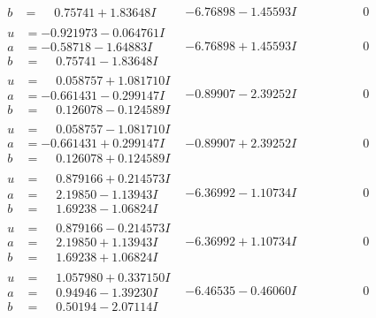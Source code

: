 \documentclass[1p]{elsarticle_modified}
\theoremstyle{definition}
\begin{document}
$$\begin{array}{c|c|c}
\begin{aligned}
b &= \phantom{-}0.75741 + 1.83648 I\end{aligned}
 & -6.76898 - 1.45593 I & \phantom{-0.000000 } 0 \\ \hline\begin{aligned}
u &= -0.921973 - 0.064761 I \\
a &= -0.58718 - 1.64883 I \\
b &= \phantom{-}0.75741 - 1.83648 I\end{aligned}
 & -6.76898 + 1.45593 I & \phantom{-0.000000 } 0 \\ \hline\begin{aligned}
u &= \phantom{-}0.058757 + 1.081710 I \\
a &= -0.661431 - 0.299147 I \\
b &= \phantom{-}0.126078 - 0.124589 I\end{aligned}
 & -0.89907 - 2.39252 I & \phantom{-0.000000 } 0 \\ \hline\begin{aligned}
u &= \phantom{-}0.058757 - 1.081710 I \\
a &= -0.661431 + 0.299147 I \\
b &= \phantom{-}0.126078 + 0.124589 I\end{aligned}
 & -0.89907 + 2.39252 I & \phantom{-0.000000 } 0 \\ \hline\begin{aligned}
u &= \phantom{-}0.879166 + 0.214573 I \\
a &= \phantom{-}2.19850 - 1.13943 I \\
b &= \phantom{-}1.69238 - 1.06824 I\end{aligned}
 & -6.36992 - 1.10734 I & \phantom{-0.000000 } 0 \\ \hline\begin{aligned}
u &= \phantom{-}0.879166 - 0.214573 I \\
a &= \phantom{-}2.19850 + 1.13943 I \\
b &= \phantom{-}1.69238 + 1.06824 I\end{aligned}
 & -6.36992 + 1.10734 I & \phantom{-0.000000 } 0 \\ \hline\begin{aligned}
u &= \phantom{-}1.057980 + 0.337150 I \\
a &= \phantom{-}0.94946 - 1.39230 I \\
b &= \phantom{-}0.50194 - 2.07114 I\end{aligned}
 & -6.46535 - 0.46060 I & \phantom{-0.000000 } 0 \\ \hline\begin{aligned}

\end{aligned}
\end{array}$$
\end{document}
